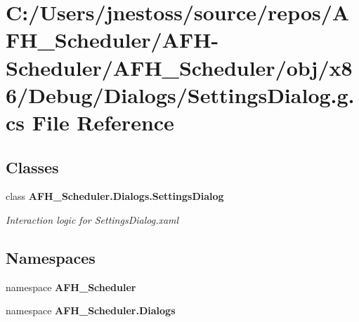 \section{C\+:/\+Users/jnestoss/source/repos/\+A\+F\+H\+\_\+\+Scheduler/\+A\+F\+H-\/\+Scheduler/\+A\+F\+H\+\_\+\+Scheduler/obj/x86/\+Debug/\+Dialogs/\+Settings\+Dialog.g.\+cs File Reference}
\label{x86_2_debug_2_dialogs_2_settings_dialog_8g_8cs}
\subsection*{Classes}
\begin{DoxyCompactItemize}
\item 
class \textbf{ A\+F\+H\+\_\+\+Scheduler.\+Dialogs.\+Settings\+Dialog}
\begin{DoxyCompactList}\small\item\em Interaction logic for Settings\+Dialog.\+xaml \end{DoxyCompactList}\end{DoxyCompactItemize}
\subsection*{Namespaces}
\begin{DoxyCompactItemize}
\item 
namespace \textbf{ A\+F\+H\+\_\+\+Scheduler}
\item 
namespace \textbf{ A\+F\+H\+\_\+\+Scheduler.\+Dialogs}
\end{DoxyCompactItemize}
